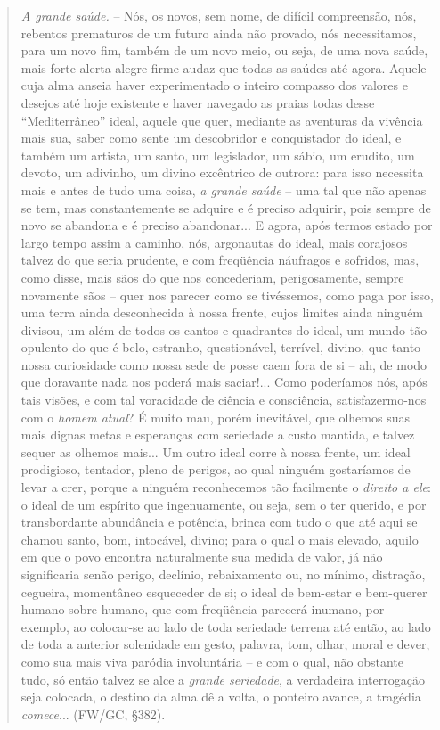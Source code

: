 \documentclass[
	12pt,				%
	openright,			%
	oneside,			%
	a4paper,			%
	english,			%
	french,				%
	spanish,			%
	brazil				%
	]{abntex2}
\begin{document}
\begin{quotation}
\textit{A grande saúde.} –  Nós, os novos, sem nome, de difícil compreensão, nós, rebentos prematuros de um futuro ainda não provado, nós necessitamos, para um novo fim, também de um novo meio, ou seja, de uma nova saúde, mais forte alerta alegre firme audaz que todas as saúdes até agora. Aquele cuja alma anseia haver experimentado o inteiro compasso dos valores e desejos até hoje existente e haver navegado as praias todas desse “Mediterrâneo” ideal, aquele que quer, mediante as aventuras da vivência mais sua, saber como sente um descobridor e conquistador do ideal, e também um artista, um santo, um legislador, um sábio, um erudito, um devoto, um adivinho, um divino excêntrico de outrora: para isso necessita mais e antes de tudo uma coisa, \textit{a grande saúde} – uma tal que não apenas se tem, mas constantemente se adquire e é preciso adquirir, pois sempre de novo se abandona e é preciso abandonar... E agora, após termos estado por largo tempo assim a caminho, nós, argonautas do ideal, mais corajosos talvez do que seria prudente, e com freqüência náufragos e sofridos, mas, como disse, mais sãos do que nos concederiam, perigosamente, sempre novamente sãos – quer nos parecer como se tivéssemos, como paga por isso, uma terra ainda desconhecida à nossa frente, cujos limites ainda ninguém divisou, um além de todos os cantos e quadrantes do ideal, um mundo tão opulento do que é belo, estranho, questionável, terrível, divino, que tanto nossa curiosidade como nossa sede de posse caem fora de si – ah, de modo que doravante nada nos poderá mais saciar!... Como poderíamos nós, após tais visões, e com tal voracidade de ciência e consciência, satisfazermo-nos com o \textit{homem atual}? É muito mau, porém inevitável, que olhemos suas mais dignas metas e esperanças com seriedade a custo mantida, e talvez sequer as olhemos mais... Um outro ideal corre à nossa frente, um ideal prodigioso, tentador, pleno de perigos, ao qual ninguém gostaríamos de levar a crer, porque a ninguém reconhecemos tão facilmente o \textit{direito a ele}: o ideal de um espírito que ingenuamente, ou seja, sem o ter querido, e por transbordante abundância e potência, brinca com tudo o que até aqui se chamou santo, bom, intocável, divino; para o qual o mais elevado, aquilo em que o povo encontra naturalmente sua medida de valor, já não significaria senão perigo, declínio, rebaixamento ou, no mínimo, distração, cegueira, momentâneo esqueceder de si; o ideal de bem-estar e bem-querer humano-sobre-humano, que com freqüência parecerá inumano, por exemplo, ao colocar-se ao lado de toda seriedade terrena até então, ao lado de toda a anterior solenidade em gesto, palavra, tom, olhar, moral e dever, como sua mais viva paródia involuntária – e com o qual, não obstante tudo, só então talvez se alce a \textit{grande seriedade}, a verdadeira interrogação seja colocada, o destino da alma dê a volta, o ponteiro avance, a tragédia \textit{comece}... (FW/GC, §382).
\end{quotation}
\end{document}
